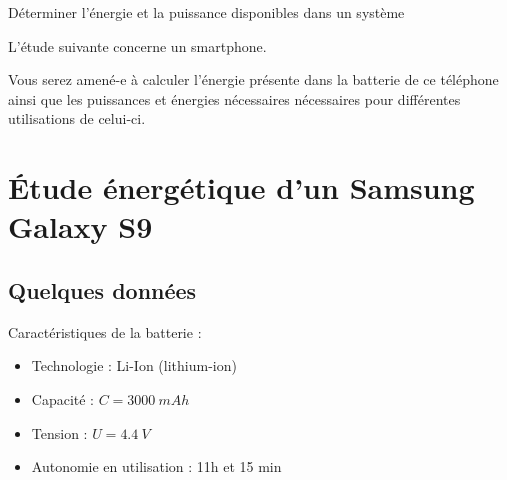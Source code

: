 \documentclass[10pt,fleqn]{article} %
\begin{document}

\begin{obj}
Déterminer l’énergie et la puissance disponibles dans un système

L’étude suivante concerne un smartphone.

Vous serez amené-e à
 calculer l’énergie présente dans la batterie de ce téléphone ainsi que les puissances et énergies nécessaires
 nécessaires pour différentes utilisations de celui-ci.

\end{obj}
\section{Étude énergétique d'un Samsung Galaxy S9}
\subsection{Quelques données}
Caractéristiques de la batterie :
\begin{itemize}
 \item Technologie : Li-Ion (lithium-ion)
\item Capacité : $ C = \SI{3000}{mAh} $
\item Tension : $U=\SI{4.4}{V}$
\item Autonomie en utilisation : 11h et 15 min
\end{itemize}
\end{document}
